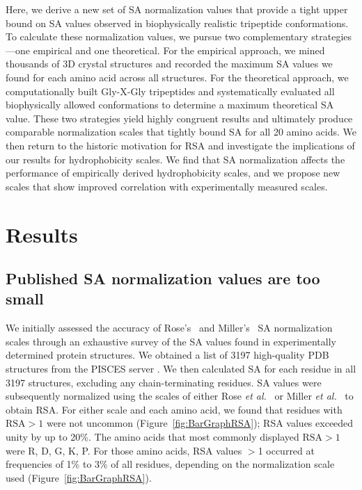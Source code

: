 \documentclass[11pt]{article}
\begin{document}
Here, we derive a new set of SA normalization values that provide a tight upper bound on SA values observed in biophysically realistic tripeptide conformations. To calculate these normalization values, we pursue two complementary strategies---one empirical and one theoretical. For the empirical approach, we mined thousands of 3D crystal structures and recorded the maximum SA values we found for each amino acid across all structures. For the theoretical approach, we computationally built Gly-X-Gly tripeptides and systematically evaluated all biophysically allowed conformations to determine a maximum theoretical SA value. These two strategies yield highly congruent results and ultimately produce comparable normalization scales that tightly bound SA for all 20 amino acids. We then return to the historic motivation for RSA and investigate the implications of our results for hydrophobicity scales. We find that SA normalization affects the performance of empirically derived hydrophobicity scales, and we propose new scales that show improved correlation with experimentally measured scales.


\section*{Results}

\subsection*{Published SA normalization values are too small}
We initially assessed the accuracy of Rose's~\cite{Rose1985} and Miller's~\cite{Miller1987} SA normalization scales through an exhaustive survey of the SA values found in experimentally determined protein structures. We obtained a list of 3197 high-quality PDB structures from the PISCES server \cite{WangDunbrack2003}. We then calculated SA for each residue in all 3197 structures, excluding any chain-terminating residues. SA values were subsequently normalized using the scales of either Rose \emph{et al.}~\cite{Rose1985} or Miller \emph{et al.}~\cite{Miller1987} to obtain RSA. For either scale and each amino acid, we found that residues with $\text{RSA}>1$ were not uncommon (Figure~\ref{fig:BarGraphRSA}); RSA values exceeded unity by up to 20\%. The amino acids that most commonly displayed $\text{RSA}>1$ were R, D, G, K, P. For those amino acids, RSA values $>$1 occurred at frequencies of 1\% to 3\% of all residues, depending on the normalization scale used (Figure~\ref{fig:BarGraphRSA}).
\end{document}
